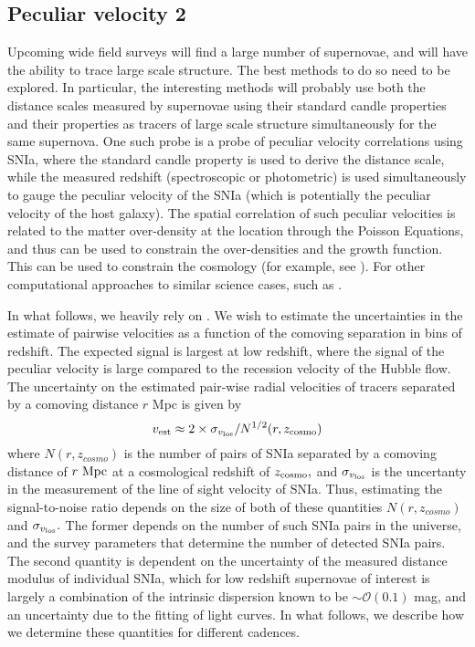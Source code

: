 \subsection{Peculiar velocity 2}
Upcoming wide field surveys will find a large number of supernovae, and will have the ability to trace large scale structure. The best methods to do so need to be explored. In particular, the interesting methods will probably use both the distance  scales measured by supernovae using their standard candle properties and their properties as tracers of large scale structure simultaneously for the same supernova. One such probe is a probe of peculiar velocity correlations using SNIa, where the standard candle property is used to derive the distance scale, while the measured redshift (spectroscopic or photometric) is used simultaneously to gauge the peculiar velocity of the SNIa (which is potentially the peculiar velocity of the host galaxy). The spatial correlation of such peculiar velocities is related to the matter over-density at the location through the Poisson Equations, and thus can be used to constrain the over-densities and the growth function. This can be used to constrain the cosmology (for example, see \cite{2011PhRvD..83d3004B}). For other computational approaches to similar science cases, such as \cite{howlett}.


In what follows, we heavily rely on \cite{2011PhRvD..83d3004B}. We wish to estimate the uncertainties in the estimate of pairwise velocities as a function of the comoving separation in bins of redshift. The expected signal is largest at low redshift, where the signal of the peculiar velocity is large compared to the recession velocity of the Hubble flow.  The uncertainty on the estimated pair-wise radial velocities of tracers separated by a comoving distance $r$ Mpc is given by
\begin{equation}
v_{\rm{est}} \approx 2 \times \sigma_{v_{\rm{los}}} / N^{1/2}(r, z_{\rm{cosmo}})
\end{equation}
where $N(r,z_{cosmo})$ is the number of pairs of SNIa separated by a comoving distance of $r~\rm{Mpc}$
at a cosmological redshift of $z_{\rm{cosmo}},$ and $\sigma_{v_{\rm{los}}}$ is the uncertanty in the
measurement of the line of sight velocity of SNIa. Thus, estimating the signal-to-noise ratio depends on the size of both of these quantities $N(r, z_{cosmo})$ and $\sigma_{v_{\rm{los}}}.$ The former depends on the number of such SNIa pairs in the universe, and the survey parameters that determine the number of detected SNIa pairs. The second quantity is dependent on the uncertainty of the measured distance modulus of individual SNIa, which for low redshift supernovae of interest is largely a combination of the intrinsic dispersion known to be $\sim \mathcal{O}(0.1)$ mag, and an uncertainty due to the fitting of light curves. In what follows, we describe how we determine these quantities for different cadences. 

